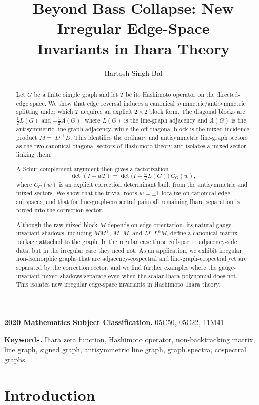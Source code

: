 \documentclass[11pt]{article}
\title{Beyond Bass Collapse: New Irregular Edge-Space\\ Invariants in Ihara Theory}
\author{Hartosh Singh Bal}
\date{}
\begin{document}
\maketitle


\begin{abstract}
Let \(G\) be a finite simple graph and let \(T\) be its Hashimoto operator on the directed-edge space. We show that edge reversal induces a canonical symmetric/antisymmetric splitting under which \(T\) acquires an explicit \(2\times 2\) block form. The diagonal blocks are \(\tfrac12 L(G)\) and \(-\tfrac12 A(G)\), where \(L(G)\) is the line-graph adjacency and \(A(G)\) is the antisymmetric line-graph adjacency, while the off-diagonal block is the mixed incidence product \(M=|D|^\top D\). This identifies the ordinary and antisymmetric line-graph sectors as the two canonical diagonal sectors of Hashimoto theory and isolates a mixed sector linking them.

A Schur-complement argument then gives a factorization
\[
\det(I-wT)=\det\!\bigl(I-\tfrac w2 L(G)\bigr)\,C_G(w),
\]
where \(C_G(w)\) is an explicit correction determinant built from the antisymmetric and mixed sectors. We show that the trivial roots \(w=\pm1\) localize on canonical edge subspaces, and that for line-graph-cospectral pairs all remaining Ihara separation is forced into the correction sector.

Although the raw mixed block \(M\) depends on edge orientation, its natural gauge-invariant shadows, including \(MM^\top\), \(M^\top M\), and \(M^\top L^kM\), define a canonical matrix package attached to the graph. In the regular case these collapse to adjacency-side data, but in the irregular case they need not. As an application, we exhibit irregular non-isomorphic graphs that are adjacency-cospectral and line-graph-cospectral yet are separated by the correction sector, and we find further examples where the gauge-invariant mixed shadows separate even when the scalar Ihara polynomial does not. This isolates new irregular edge-space invariants in Hashimoto--Ihara theory.
\end{abstract}

\medskip
\noindent\textbf{2020 Mathematics Subject Classification.}
05C50, 05C22, 11M41.

\noindent\textbf{Keywords.}
Ihara zeta function, Hashimoto operator, non-backtracking matrix, line graph, signed graph, antisymmetric line graph, graph spectra, cospectral graphs.

\bigskip

\section{Introduction}
\end{document}
